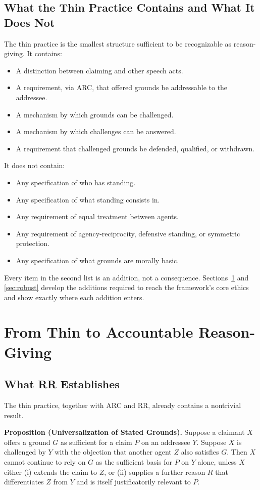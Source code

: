\documentclass[11pt]{article}
\begin{document}
\subsection{What the Thin Practice Contains and What It Does Not}
The thin practice is the smallest structure sufficient to be recognizable as reason-giving. It contains:
\begin{itemize}
\item A distinction between claiming and other speech acts.
\item A requirement, via ARC, that offered grounds be addressable to the addressee.
\item A mechanism by which grounds can be challenged.
\item A mechanism by which challenges can be answered.
\item A requirement that challenged grounds be defended, qualified, or withdrawn.
\end{itemize}
It does not contain:
\begin{itemize}
\item Any specification of who has standing.
\item Any specification of what standing consists in.
\item Any requirement of equal treatment between agents.
\item Any requirement of agency-reciprocity, defensive standing, or symmetric protection.
\item Any specification of what grounds are morally basic.
\end{itemize}
Every item in the second list is an addition, not a consequence. Sections~\ref{sec:accountable} and \ref{sec:robust} develop the additions required to reach the framework's core ethics and show exactly where each addition enters.

\section{From Thin to Accountable Reason-Giving}\label{sec:accountable}
\subsection{What RR Establishes}
The thin practice, together with ARC and RR, already contains a nontrivial result.
\begin{paperbox}
\textbf{Proposition (Universalization of Stated Grounds).} Suppose a claimant $X$ offers a ground $G$ as sufficient for a claim $P$ on an addressee $Y$. Suppose $X$ is challenged by $Y$ with the objection that another agent $Z$ also satisfies $G$. Then $X$ cannot continue to rely on $G$ as the sufficient basis for $P$ on $Y$ alone, unless $X$ either (i) extends the claim to $Z$, or (ii) supplies a further reason $R$ that differentiates $Z$ from $Y$ and is itself justificatorily relevant to $P$.
\end{paperbox}
\end{document}
